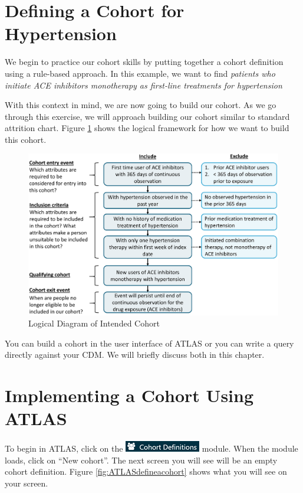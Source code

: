 \documentclass[11pt]{book}
\theoremstyle{definition}
\theoremstyle{definition}
\theoremstyle{definition}
\theoremstyle{remark}
\begin{document}
\section{Defining a Cohort for
Hypertension}\label{defining-a-cohort-for-hypertension}

We begin to practice our cohort skills by putting together a cohort
definition using a rule-based approach. In this example, we want to find
\emph{patients who initiate ACE inhibitors monotherapy as first-line
treatments for hypertension}

With this context in mind, we are now going to build our cohort. As we
go through this exercise, we will approach building our cohort similar
to standard attrition chart. Figure \ref{fig:CohortPractice} shows the
logical framework for how we want to build this cohort.

\begin{figure}

{\centering \includegraphics[width=1\linewidth]{images/Cohorts/CohortPractice} 

}

\caption{Logical Diagram of Intended Cohort}\label{fig:CohortPractice}
\end{figure}

You can build a cohort in the user interface of ATLAS or you can write a
query directly against your CDM. We will briefly discuss both in this
chapter.

\section{Implementing a Cohort Using
ATLAS}\label{implementing-a-cohort-using-atlas}

To begin in ATLAS, click on the
\includegraphics{images/Cohorts/cohortdefinition.png} module. When the
module loads, click on ``New cohort''. The next screen you will see will
be an empty cohort definition. Figure \ref{fig:ATLASdefineacohort} shows
what you will see on your screen.
\end{document}
